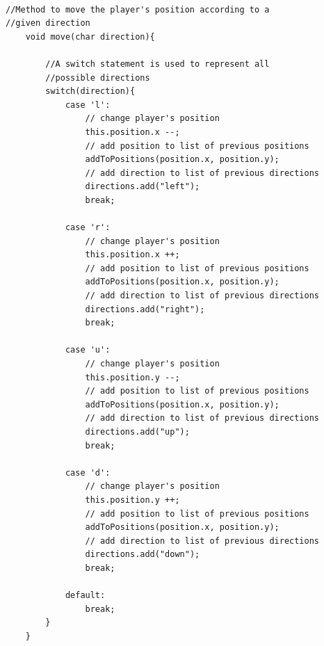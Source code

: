 \documentclass[a4paper,12pt]{extarticle}
\begin{document}
\begin{lstlisting}

//Method to move the player's position according to a 
//given direction
    void move(char direction){

        //A switch statement is used to represent all 
        //possible directions
        switch(direction){
            case 'l':
                // change player's position
                this.position.x --;
                // add position to list of previous positions
                addToPositions(position.x, position.y);
                // add direction to list of previous directions
                directions.add("left");
                break;

            case 'r':
                // change player's position
                this.position.x ++;
                // add position to list of previous positions
                addToPositions(position.x, position.y);
                // add direction to list of previous directions
                directions.add("right");
                break;

            case 'u':
                // change player's position
                this.position.y --;
                // add position to list of previous positions
                addToPositions(position.x, position.y);
                // add direction to list of previous directions
                directions.add("up");
                break;

            case 'd':
                // change player's position
                this.position.y ++;
                // add position to list of previous positions
                addToPositions(position.x, position.y);
                // add direction to list of previous directions
                directions.add("down");
                break;

            default:
                break;
        }
    }

\end{lstlisting}
\vspace{4mm}

\newpage
\end{document}
